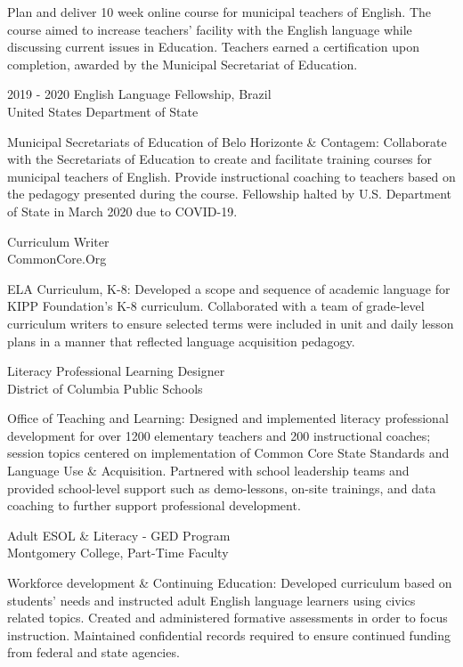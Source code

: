 \documentclass[]{scrartcl}
\begin{document}
\begin{cleanCV}
\JobDesc{}
{Plan and deliver 10 week online course for municipal teachers of English. The course aimed to increase teachers' facility with the English language while discussing current issues in Education. Teachers earned a certification upon completion, awarded by the Municipal Secretariat of Education.}

\WorkExperience
{2019 - 2020}
{English Language Fellowship, Brazil}
{\\United States Department of State}

\JobDesc{}
{Municipal Secretariats of Education of Belo Horizonte \& Contagem: Collaborate with the Secretariats of Education to create and facilitate training courses for municipal teachers of English. Provide instructional coaching to teachers based on the pedagogy presented during the course. Fellowship halted by U.S. Department of State in March 2020 due to COVID-19.}

{Curriculum Writer}
{\\CommonCore.Org}

\JobDesc{}
{ELA Curriculum, K-8: Developed a scope and sequence of academic language for KIPP Foundation's K-8 curriculum. Collaborated with a team of grade-level curriculum writers to ensure selected terms were included in unit and daily lesson plans in a manner that reflected language acquisition pedagogy.}

{Literacy Professional Learning Designer}
{\\District of Columbia Public Schools}

\JobDesc{}
{Office of Teaching and Learning: Designed and implemented literacy professional development for over 1200 elementary teachers and 200 instructional coaches; session topics centered on implementation of Common Core State Standards and Language Use \& Acquisition. Partnered with school leadership teams and provided school-level support such as demo-lessons, on-site trainings, and data coaching to further support professional development.}

{Adult ESOL \& Literacy - GED Program}
{\\Montgomery College, Part-Time Faculty}

\JobDesc{}
{Workforce development \& Continuing Education: Developed curriculum based on students' needs and instructed adult English language learners using civics related topics. Created and administered formative assessments in order to focus instruction. Maintained confidential records required to ensure continued funding from federal and state agencies.}



\end{cleanCV}
\end{document}
